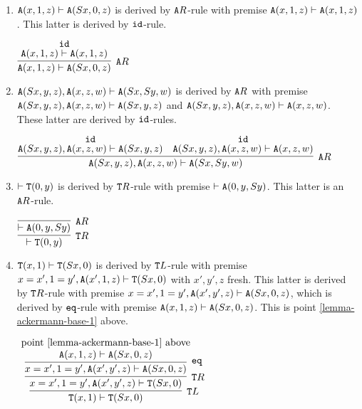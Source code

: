 \documentclass[a4paper,12pt]{article}
\newenvironment{proof}[1][Proof]{\begin{trivlist}
\item[\hskip \labelsep {\bfseries #1}]}{\end{trivlist}}
\newcommand{\id}              { {\tt id} }
\newcommand{\eq}              { {\tt eq} }
\newcommand{\Tot}           { {\tt T} }
\newcommand{\Ack}   {{\tt A}}
\begin{document}
\begin{proof}
\begin{enumerate}
\item
$\Ack(x,1,z) \vdash \Ack(Sx,0,z)$ is derived by $\Ack R$-rule with premise 
$\Ack(x,1,z) \vdash \Ack(x,1,z)$. This latter is derived by $\id$-rule.

\begin{center}
$
\infer[\Ack R]
 {\Ack(x,1,z) \vdash \Ack(Sx,0,z)}
 {\deduce{\Ack(x,1,z) \vdash \Ack(x,1,z)}
               {\id}
 }
$
\end{center}

\item 
$\Ack(Sx,y,z), \Ack(x,z,w) \vdash \Ack(Sx,Sy,w)$ is derived by $\Ack R$ with premise
$\Ack(Sx,y,z), \Ack(x,z,w) \vdash \Ack(Sx,y,z)$ and $\Ack(Sx,y,z), \Ack(x,z,w) \vdash  \Ack(x,z,w)$. These latter are derived by $\id$-rules.

\begin{center}
$
\infer[\Ack R]
 {\Ack(Sx,y,z), \Ack(x,z,w) \vdash \Ack(Sx,Sy,w)}
 {
   \deduce{\Ack(Sx,y,z), \Ack(x,z,w) \vdash \Ack(Sx,y,z)}
               {\id}
 &
  \deduce{\Ack(Sx,y,z), \Ack(x,z,w) \vdash  \Ack(x,z,w)}
               {\id}
 }
$
\end{center}

\item
$\vdash \Tot(0,y)$ is derived by $\Tot R$-rule with premise $\vdash \Ack(0,y,Sy)$.
This latter is an $\Ack R$-rule.

\begin{center}
$
\infer[\Tot R]
 {\vdash \Tot(0,y)}
 {\infer[\Ack R]
    {\vdash \Ack(0,y,Sy)}
    {}
 }
$
\end{center}

\item 
$\Tot(x,1) \vdash \Tot(Sx,0)$ is derived by $\Tot L$-rule with premise 
$x=x', 1=y', \Ack(x',1,z) \vdash \Tot(Sx,0)$ with $x',y',z$ fresh. This latter is derived
by $\Tot R$-rule with premise $x=x', 1=y', \Ack(x',y',z) \vdash \Ack(Sx,0,z)$,
which is derived by $\eq$-rule with premise $\Ack(x,1,z) \vdash \Ack(Sx,0,z)$.
This is point \ref{lemma-ackermann-base-1} above.

\begin{center}
$
\infer[\Tot L]
 {\Tot(x,1) \vdash \Tot(Sx,0)}
 {\infer[\Tot R]
    {x=x',1=y', \Ack(x',y',z) \vdash \Tot(Sx,0)}
    {\infer[\eq]
      {x=x', 1=y',\Ack(x',y',z) \vdash \Ack(Sx,0,z)}
      {\deduce{\Ack(x,1,z) \vdash \Ack(Sx,0,z)}
                     {\mbox{ point \ref{lemma-ackermann-base-1} above }}
      }
    }
 }
$
\end{center}


\end{enumerate}
\end{proof}
\end{document}
